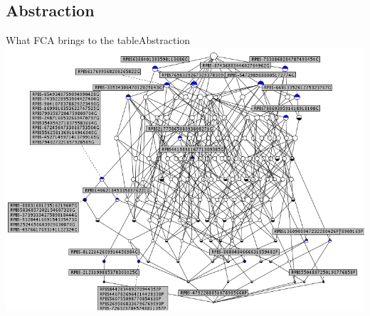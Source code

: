 \subsection{Abstraction}

\begin{frame}{What FCA brings to the table}{Abstraction}
\vspace{0pt}
\centering
\includegraphics[width=0.9\linewidth]{img/fca/lattice_abstraction}
\end{frame}

